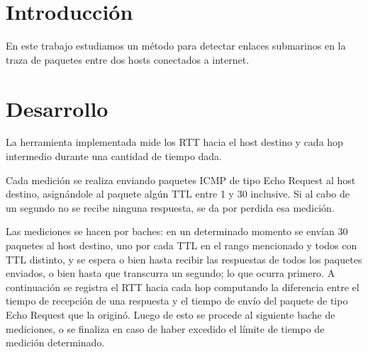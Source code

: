 \documentclass[a4paper, 10pt, twoside]{article}
\begin{document}
\newpage




\tableofcontents

\newpage




\section{Introducción}

En este trabajo estudiamos un método para detectar enlaces submarinos en la traza de paquetes entre dos hosts conectados a internet.




\section{Desarrollo}

La herramienta implementada mide los RTT hacia el host destino y cada hop intermedio durante una cantidad de tiempo dada.

Cada medición se realiza enviando paquetes ICMP de tipo Echo Request al host destino, asignándole al paquete algún TTL entre 1 y 30 inclusive. Si al cabo de un segundo no se recibe ninguna respuesta, se da por perdida esa medición.

Las mediciones se hacen por baches: en un determinado momento se envían 30 paquetes al host destino, uno por cada TTL en el rango mencionado y todos con TTL distinto, y se espera o bien hasta recibir las respuestas de todos los paquetes enviados, o bien hasta que transcurra un segundo; lo que ocurra primero. A continuación se registra el RTT hacia cada hop computando la diferencia entre el tiempo de recepción de una respuesta y el tiempo de envío del paquete de tipo Echo Request que la originó. Luego de esto se procede al siguiente bache de mediciones, o se finaliza en caso de haber excedido el límite de tiempo de medición determinado.
\end{document}
